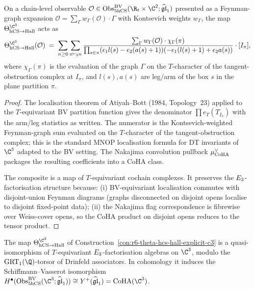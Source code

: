 \begin{proposition}
\label{prop:r6-theta-explicit-formula-c3}
On a chain-level observable $\mathcal O\in\Obs^{\BV}_{5\hCS}(\R_t\times\C^2;\ghat)$
presented as a Feynman-graph expansion
$\mathcal O = \sum_\Gamma w_\Gamma(\mathcal O)\cdot\Gamma$ with
Kontsevich weights $w_\Gamma$, the map $\Theta_{\hCS\to\Hall}^{\C^3}$
acts as
\[
\Theta_{\hCS\to\Hall}^{\C^3}(\mathcal O)
\;=\;
\sum_{n\geq 0}\sum_{\pi\vdash_3 n}
\frac{\sum_\Gamma w_\Gamma(\mathcal O)\cdot\chi_\Gamma(\pi)}
{\prod_{s\in\pi}(\epsilon_1 l(s) - \epsilon_2(a(s)+1))
(-\epsilon_1(l(s)+1) + \epsilon_2 a(s))}
\cdot [I_\pi],
\]
where $\chi_\Gamma(\pi)$ is the evaluation of the graph $\Gamma$ on
the $T$-character of the tangent-obstruction complex at $I_\pi$, and
$l(s),a(s)$ are leg/arm of the box $s$ in the plane partition $\pi$.
\end{proposition}

\begin{proof}
The localisation theorem of Atiyah--Bott (1984, Topology~23) applied
to the $T$-equivariant BV partition function gives the denominator
$\prod e_T(T_{I_\pi})$ with the arm/leg statistics as written. The
numerator is the Kontsevich-weighted Feynman-graph sum evaluated on
the $T$-character of the tangent-obstruction complex; this is the
standard MNOP localisation formula for DT invariants of $\C^3$
adapted to the BV setting. The Nakajima convolution pullback
$\mu_{\mathrm{CoHA}}^\vee$ packages the resulting coefficients into a CoHA
class.

The composite is a map of $T$-equivariant cochain complexes. It
preserves the $E_3$-factorisation structure because: (i)
BV-equivariant localisation commutes with disjoint-union Feynman
diagrams (graphs disconnected on disjoint opens localise to disjoint
fixed-point data); (ii) the Nakajima flag correspondence is
fibrewise over Weiss-cover opens, so the CoHA product on disjoint
opens reduces to the tensor product.
\end{proof}

\begin{theorem}
\label{thm:r6-theta-qiso-c3}
The map $\Theta_{\hCS\to\Hall}^{\C^3}$ of
Construction~\ref{con:r6-theta-hcs-hall-explicit-c3} is a
quasi-isomorphism of $T$-equivariant $E_3$-factorisation algebras
on $\C^3$, modulo the $\GRT_1(\Q)$-torsor of Drinfeld associators. In
cohomology it induces the Schiffmann--Vasserot isomorphism
$H^\bullet(\Obs^{\BV}_{5\hCS}(\C^3;\ghat))\cong Y^+(\ghat) = \CoHA(\C^3)$.
\end{theorem}

